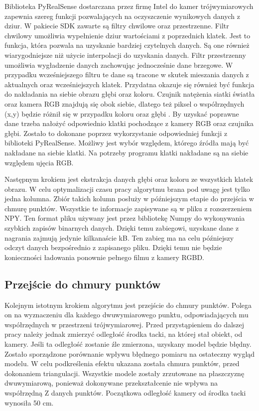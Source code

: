 Biblioteka PyRealSense dostarczana przez firmę Intel do kamer trójwymiarowych zapewnia szereg funkcji pozwalających na oczyszczenie wynikowych danych z dziur. W pakiecie SDK zawarte są filtry chwilowe oraz przestrzenne. Filtr chwilowy umożliwia wypełnienie dziur wartościami z poprzednich klatek. Jest to funkcja, która pozwala na uzyskanie bardziej czytelnych danych. Są one również wiarygodniejsze niż użycie interpolacji do uzyskania danych. Filtr przestrzenny umożliwia wygładzenie danych zachowując jednocześnie dane brzegowe. W przypadku wcześniejszego filtru te dane są tracone w skutek mieszania danych z aktualnych oraz wcześniejszych klatek. Przydatna okazuje się również być funkcja do nakładania na siebie obrazu głębi oraz koloru. Czujnik natężenia siatki światła oraz kamera RGB znajdują się obok siebie, dlatego też piksel o współrzędnych (x,y) będzie różnił się w przypadku koloru oraz głębi \cite{IntelRealSenseSheet}. By uzyskać poprawne dane trzeba nałożyć odpowiednio klatki pochodzące z kamery RGB oraz czujnika głębi. Zostało to dokonane poprzez wykorzystanie odpowiedniej funkcji z biblioteki PyRealSense. Możliwy jest wybór względem, którego źródła mają być nakładane na siebie klatki. Na potrzeby programu klatki nakładane są na siebie względem ujęcia RGB.

Następnym krokiem jest ekstrakcja danych głębi oraz koloru ze wszystkich klatek obrazu. W celu optymalizacji czasu pracy algorytmu brana pod uwagę jest tylko jedna kolumna. Zbiór takich kolumn posłuży w późniejszym etapie do przejścia w chmurę punktów. Wszystkie te informacje zapisywane są w pliku z rozszerzeniem NPY. Ten format pliku używany jest przez bibliotekę Numpy do wykonywania szybkich zapisów binarnych danych. Dzięki temu zabiegowi, uzyskane dane z nagrania zajmują jedynie kilkanaście kB. Ten zabieg ma na celu późniejszy odczyt danych bezpośrednio z zapisanego pliku. Dzięki temu nie będzie konieczności ładowania ponownie pełnego filmu z kamery RGBD.
\subsection{Przejście do chmury punktów}
Kolejnym istotnym krokiem algorytmu jest przejście do chmury punktów. Polega on na wyznaczeniu dla każdego dwuwymiarowego punktu, odpowiadających mu współrzędnych w przestrzeni trójwymiarowej. Przed przystąpieniem do dalszej pracy należy jednak zmierzyć odległość środka tacki, na której stał obiekt, od kamery. Jeśli ta odległość zostanie źle zmierzona, uzyskany model będzie błędny. Zostało sporządzone porównanie wpływu błędnego pomiaru na ostateczny wygląd modelu. W celu podkreślenia efektu ukazana została chmura punktów, przed dokonaniem triangulacji. Wszystkie modele zostały zrzutowane na płaszczyznę dwuwymiarową, ponieważ dokonywane przekształcenie nie wpływa na współrzędną Z danych punktów. Początkowa odległość kamery od środka tacki wynosiła 50 cm.

